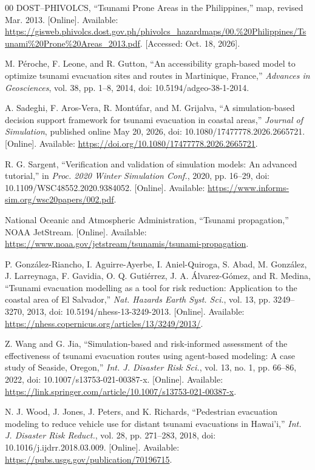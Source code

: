 \documentclass[conference]{IEEEtran}
\begin{document}
\begin{thebibliography}{00}
DOST--PHIVOLCS, ``Tsunami Prone Areas in the Philippines,'' map, revised Mar. 2013. [Online]. Available: \url{https://gisweb.phivolcs.dost.gov.ph/phivolcs_hazardmaps/00.%20Philippines/Tsunami%20Prone%20Areas_2013.pdf}. [Accessed: Oct. 18, 2026].

M. P\'eroche, F. Leone, and R. Gutton, ``An accessibility graph-based model to optimize tsunami evacuation sites and routes in Martinique, France,'' \emph{Advances in Geosciences}, vol. 38, pp. 1--8, 2014, doi: 10.5194/adgeo-38-1-2014.

A. Sadeghi, F. Aros-Vera, R. Mont\'ufar, and M. Grijalva, ``A simulation-based decision support framework for tsunami evacuation in coastal areas,'' \emph{Journal of Simulation}, published online May 20, 2026, doi: 10.1080/17477778.2026.2665721. [Online]. Available: \url{https://doi.org/10.1080/17477778.2026.2665721}.

R. G. Sargent, ``Verification and validation of simulation models: An advanced tutorial,'' in \emph{Proc. 2020 Winter Simulation Conf.}, 2020, pp. 16--29, doi: 10.1109/WSC48552.2020.9384052. [Online]. Available: \url{https://www.informs-sim.org/wsc20papers/002.pdf}.

National Oceanic and Atmospheric Administration, ``Tsunami propagation,'' NOAA JetStream. [Online]. Available: \url{https://www.noaa.gov/jetstream/tsunamis/tsunami-propagation}.

P. Gonz\'alez-Riancho, I. Aguirre-Ayerbe, I. Aniel-Quiroga, S. Abad, M. Gonz\'alez, J. Larreynaga, F. Gavidia, O. Q. Guti\'errez, J. A. \'Alvarez-G\'omez, and R. Medina, ``Tsunami evacuation modelling as a tool for risk reduction: Application to the coastal area of El Salvador,'' \emph{Nat. Hazards Earth Syst. Sci.}, vol. 13, pp. 3249--3270, 2013, doi: 10.5194/nhess-13-3249-2013. [Online]. Available: \url{https://nhess.copernicus.org/articles/13/3249/2013/}.

Z. Wang and G. Jia, ``Simulation-based and risk-informed assessment of the effectiveness of tsunami evacuation routes using agent-based modeling: A case study of Seaside, Oregon,'' \emph{Int. J. Disaster Risk Sci.}, vol. 13, no. 1, pp. 66--86, 2022, doi: 10.1007/s13753-021-00387-x. [Online]. Available: \url{https://link.springer.com/article/10.1007/s13753-021-00387-x}.

N. J. Wood, J. Jones, J. Peters, and K. Richards, ``Pedestrian evacuation modeling to reduce vehicle use for distant tsunami evacuations in Hawai'i,'' \emph{Int. J. Disaster Risk Reduct.}, vol. 28, pp. 271--283, 2018, doi: 10.1016/j.ijdrr.2018.03.009. [Online]. Available: \url{https://pubs.usgs.gov/publication/70196715}.


\end{thebibliography}
\end{document}
